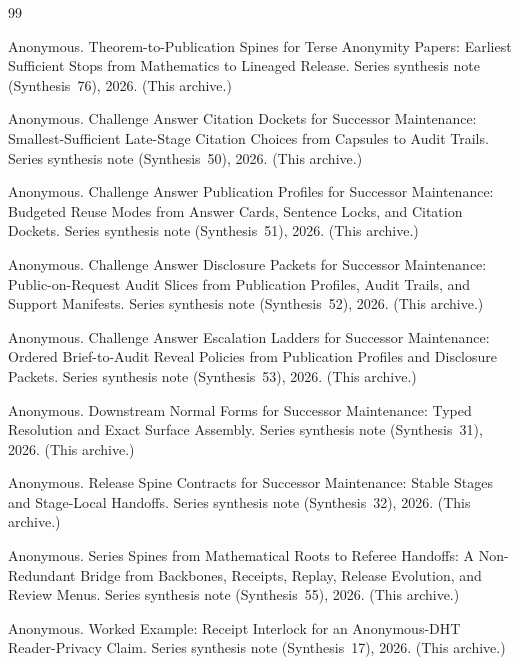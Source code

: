 \documentclass[11pt]{article}
\begin{document}
\begin{thebibliography}{99}\small

Anonymous.
\newblock Theorem-to-Publication Spines for Terse Anonymity Papers: Earliest Sufficient Stops from Mathematics to Lineaged Release.
\newblock Series synthesis note (Synthesis~76), 2026. (This archive.)

Anonymous.
\newblock Challenge Answer Citation Dockets for Successor Maintenance: Smallest-Sufficient Late-Stage Citation Choices from Capsules to Audit Trails.
\newblock Series synthesis note (Synthesis~50), 2026. (This archive.)

Anonymous.
\newblock Challenge Answer Publication Profiles for Successor Maintenance: Budgeted Reuse Modes from Answer Cards, Sentence Locks, and Citation Dockets.
\newblock Series synthesis note (Synthesis~51), 2026. (This archive.)

Anonymous.
\newblock Challenge Answer Disclosure Packets for Successor Maintenance: Public-on-Request Audit Slices from Publication Profiles, Audit Trails, and Support Manifests.
\newblock Series synthesis note (Synthesis~52), 2026. (This archive.)

Anonymous.
\newblock Challenge Answer Escalation Ladders for Successor Maintenance: Ordered Brief-to-Audit Reveal Policies from Publication Profiles and Disclosure Packets.
\newblock Series synthesis note (Synthesis~53), 2026. (This archive.)

Anonymous.
\newblock Downstream Normal Forms for Successor Maintenance: Typed Resolution and Exact Surface Assembly.
\newblock Series synthesis note (Synthesis~31), 2026. (This archive.)

Anonymous.
\newblock Release Spine Contracts for Successor Maintenance: Stable Stages and Stage-Local Handoffs.
\newblock Series synthesis note (Synthesis~32), 2026. (This archive.)

Anonymous.
\newblock Series Spines from Mathematical Roots to Referee Handoffs: A Non-Redundant Bridge from Backbones, Receipts, Replay, Release Evolution, and Review Menus.
\newblock Series synthesis note (Synthesis~55), 2026. (This archive.)

Anonymous.
\newblock Worked Example: Receipt Interlock for an Anonymous-DHT Reader-Privacy Claim.
\newblock Series synthesis note (Synthesis~17), 2026. (This archive.)


\end{thebibliography}
\end{document}

